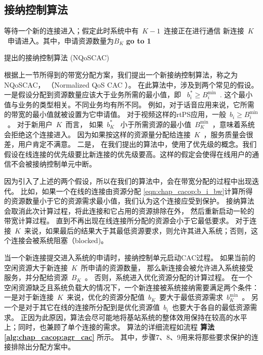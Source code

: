 \subsection{接纳控制算法}
\label{sec_alg}
\begin{algorithm}[htbp]
\SetAlgoLined
等待一个新的连接进入；假定此时系统中有~$K-1$~连接正在进行通信\;
新连接~$K$~申请进入。其中，申请资源数量为$B_K$\;
{\bf{go to 1}}\;
\caption{提出的接纳控制算法 (NQoSCAC)} \label{alg:chap_cacop:agr_cac}
\end{algorithm}

根据上一节所得到的带宽分配方案，我们提出一个新接纳控制算法，称之为NQoSCAC， （Normalized QoS CAC ）。
在此算法中，涉及到两个常见的假设。 一是假设分配到资源数量应该大于业务所需的最小值，即
~$b_i^* \ge B_i^{\min}$~. 
这个最小值与业务的类型相关。不同业务均有所不同。
例如，对于话音应用来说，它所需的带宽的最小值就被设置为它申请值。
对于视频这样的rtPS应用，一般~$b_i\ge B_i^{\min}$~。
对于新用户~$K$~而言，
如果~$b_K^*$~ 小于所需资源的最小值~$B_K^{\min}$~，意味着系统会拒绝这个连接进入。
因为如果按这样的资源量分配给连接~$K$~，服务质量会很差，用户肯定不满意。
二是，
在我们提出的算法中，使用了优先级的概念。我们假设在线连接的优先级要比新连接的优先级要高。这样的假定会使得在线用户的通信不会被接纳控制单元中断。

因为引入了上述的两个假设，所以在我们的算法中，会在带宽分配的过程中出现迭代。
比如，如果一个在线的连接由资源分配 \eqref{eqn:chap_cacop:b_i_bw}计算所得的资源数量小于它的资源需求最小值，我们认为这个连接应受到保护。
接纳算法会取消此次计算过程，将此连接和它占用的资源排除在外，
然后重新启动一轮的带宽计算过程。
直到不再出现在线连接所分配的资源会小于它最低要求。
对于连接~$K$~来说，如果最后的结果大于其最低资源要求，则允许其进入系统；否则，这个连接会被系统阻塞（blocked)。


当一个新连接提交进入系统的申请时，接纳控制单元启动CAC过程。
如果当前的空闲资源大于新连接~$K$~所申请的资源数量，
那么新连接会被允许进入系统接受服务，并分配给资源~$B_K$~。
否则，系统进入优化资源分配的计算过程。
在一个空闲资源缺乏且系统负载大的情况下，一个新连接被系统接纳需要满足两个条件：
一是对于新连接~$K$~来说，优化的资源分配值~$b_K$~要大于最低资源需求~$b_K^{\min}$~。
另一个是对于其它在线的连接所分配到是优化资源值~$b_i$~也要大于各自的最低资源需求。
正因为此原因，算法会尽可能地将基站系统的整体效用保持在较高的水平上；同时，也兼顾了单个连接的需求。
算法的详细流程如流程{\bf{ 算法 \ref{alg:chap_cacop:agr_cac}}} 所示。
其中，步骤7、8、9用来将那些要求保护的连接排除出分配方案中。


